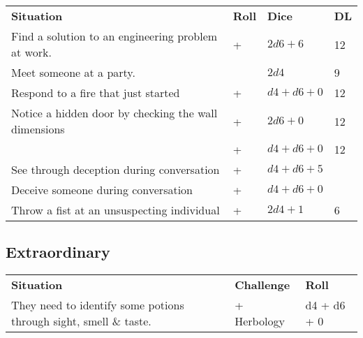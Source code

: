 \begin{center}
	\begin{xltabular}{\textwidth}{Xlll}
		\textbf{Situation}																& \textbf{Roll} 														& \textbf{Dice}	& \textbf{DL}	\\
		Find a solution to an engineering problem at work.								&  + 				& $2d6+6$ 		& 12 \\
		Meet someone at a party.														& 											& $2d4$ 		& 9 \\
		Respond to a fire that just started												&  +  			& $d4+d6+0$ 	& 12 \\
		Notice a hidden door by checking the wall dimensions							&  +  			& $2d6+0$ 		& 12 \\
																						&  +  			& $d4+d6+0$ 	& 12 \\
		See through deception during conversation										&  + 							& $d4+d6+5$ 	&  \\
		Deceive someone during conversation 											&  + 						& $d4+d6+0$ 	&  \\
		Throw a fist at an unsuspecting individual										&  + 						& $2d4+1$ 		& 6 \\
	\end{xltabular}
\end{center}

\subsection*{Extraordinary}

\begin{center}
	\begin{xltabular}{\textwidth}{Xll}
		\textbf{Situation}													& \textbf{Challenge} 								& \textbf{Roll} \\
		They need to identify some potions through sight, smell \& taste. 	&  + Herbology		& d4 + d6 + 0 \\
	\end{xltabular}
\end{center}





